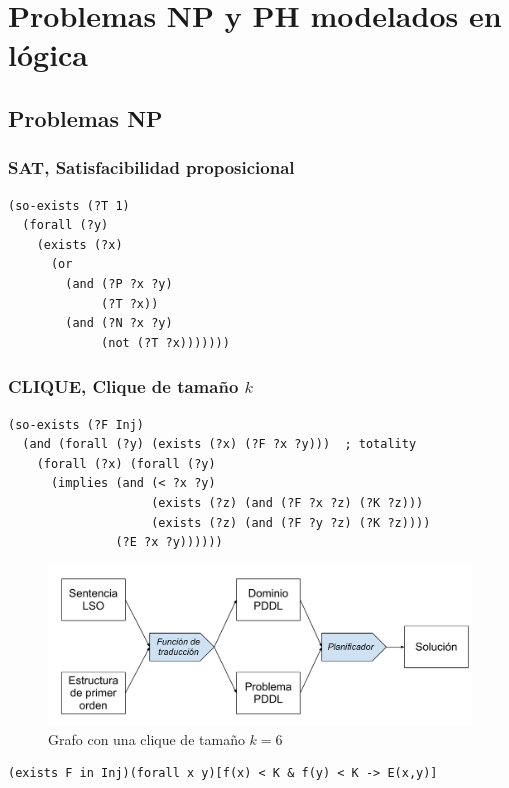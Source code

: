 
\chapter{Problemas NP y PH modelados en lógica}
\label{apendiceA}

\section{Problemas NP}

\subsection{SAT, Satisfacibilidad proposicional}
\begin{verbatim}
(so-exists (?T 1)
  (forall (?y)
    (exists (?x)
      (or
        (and (?P ?x ?y)
             (?T ?x)) 
        (and (?N ?x ?y)
             (not (?T ?x)))))))
\end{verbatim}

\subsection{CLIQUE, Clique de tamaño $k$}
\begin{verbatim}
(so-exists (?F Inj)
  (and (forall (?y) (exists (?x) (?F ?x ?y)))  ; totality
    (forall (?x) (forall (?y)
      (implies (and (< ?x ?y)
                    (exists (?z) (and (?F ?x ?z) (?K ?z)))
                    (exists (?z) (and (?F ?y ?z) (?K ?z))))
               (?E ?x ?y))))))
\end{verbatim}
\begin{figure}[h!]
\centering
\includegraphics[width=\textwidth]{figuras/esquema_herramienta.pdf}
\caption[Grafo con una \textit{clique} de tamaño $k = 6$]{Grafo con una clique de tamaño
$k = 6$}
\label{clique}
\end{figure}

\begin{verbatim}
(exists F in Inj)(forall x y)[f(x) < K & f(y) < K -> E(x,y)]
\end{verbatim}

